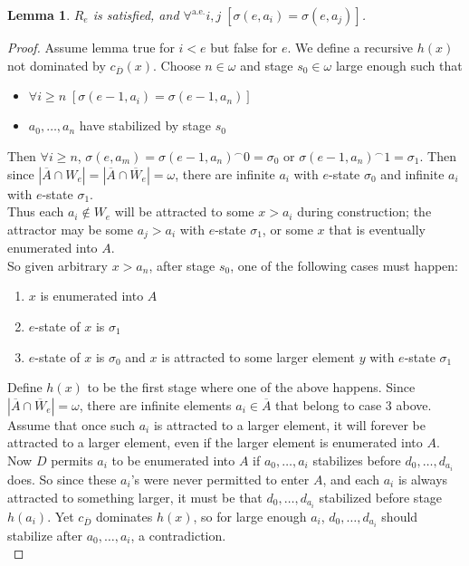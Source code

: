 \documentclass{article}
\newtheorem{lemma}{Lemma}[subsection]
\begin{document}
  \begin{lemma}
    $R_e$ is satisfied, and $\forall^{\text{a.e.}} i,j\;
    [\sigma(e,a_i)=\sigma(e,a_j)]$.
  \end{lemma}
  \begin{proof}
    Assume lemma true for $i<e$ but false for $e$. We define a recursive
    $h(x)$ not dominated by $c_{\overline{D}}(x)$. Choose $n\in\omega$ and
    stage $s_0\in\omega$ large enough such that
    \begin{itemize}
      \item $\forall i\geq n\; [\sigma(e-1,a_i) =\sigma(e-1,a_n)]$
      \item $a_0,\ldots,a_n$ have stabilized by stage $s_0$
    \end{itemize}

    Then $\forall i\geq n$, $\sigma(e,a_m) =\sigma(e-1,a_n)^\frown0
    =\sigma_0$ or $\sigma(e-1,a_n)^\frown1 =\sigma_1$. Then since
    $|\overline{A}\cap W_e|=|\overline{A}\cap\overline{W}_e| =\omega$,
    there are infinite $a_i$ with $e$-state $\sigma_0$ and infinite $a_i$
    with $e$-state $\sigma_1$. \\

    Thus each $a_i\not\in W_e$ will be attracted to some $x>a_i$ during
    construction; the attractor may be some $a_j>a_i$ with $e$-state
    $\sigma_1$, or some $x$ that is eventually enumerated into $A$. \\

    So given arbitrary $x>a_n$, after stage $s_0$, one of the following
    cases must happen:
    \begin{enumerate}
      \item $x$ is enumerated into $A$
      \item $e$-state of $x$ is $\sigma_1$
      \item $e$-state of $x$ is $\sigma_0$ and $x$ is attracted to some
        larger element $y$ with $e$-state $\sigma_1$
    \end{enumerate}

    Define $h(x)$ to be the first stage where one of the above happens.
    Since $|\overline{A}\cap\overline{W}_e|=\omega$, there are infinite
    elements $a_i\in\overline{A}$ that belong to case 3 above. Assume that
    once such $a_i$ is attracted to a larger element, it will forever be
    attracted to a larger element, even if the larger element is enumerated
    into $A$. \\

    Now $D$ permits $a_i$ to be enumerated into $A$ if $a_0,\ldots,a_i$
    stabilizes before $d_0,\ldots,d_{a_i}$ does. So since these $a_i$'s
    were never permitted to enter $A$, and each $a_i$ is always attracted
    to something larger, it must be that $d_0,\ldots,d_{a_i}$
    stabilized before stage $h(a_i)$. Yet $c_{\overline{D}}$ dominates
    $h(x)$, so for large enough $a_i$, $d_0,\ldots,d_{a_i}$ should
    stabilize after $a_0,\ldots,a_i$, a contradiction. \\


\end{proof}
\end{document}
